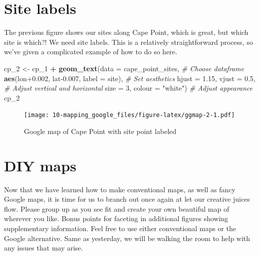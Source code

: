 \documentclass[
]{book}
\newenvironment{Shaded}{\begin{snugshade}}{\end{snugshade}}
\newcommand{\CommentTok}[1]{\textcolor[rgb]{0.56,0.35,0.01}{\textit{#1}}}
\newcommand{\DataTypeTok}[1]{\textcolor[rgb]{0.13,0.29,0.53}{#1}}
\newcommand{\DecValTok}[1]{\textcolor[rgb]{0.00,0.00,0.81}{#1}}
\newcommand{\FloatTok}[1]{\textcolor[rgb]{0.00,0.00,0.81}{#1}}
\newcommand{\KeywordTok}[1]{\textcolor[rgb]{0.13,0.29,0.53}{\textbf{#1}}}
\newcommand{\NormalTok}[1]{#1}
\newcommand{\OperatorTok}[1]{\textcolor[rgb]{0.81,0.36,0.00}{\textbf{#1}}}
\newcommand{\StringTok}[1]{\textcolor[rgb]{0.31,0.60,0.02}{#1}}
\begin{document}
\hypertarget{site-labels}{%
\section{Site labels}\label{site-labels}}

The previous figure shows our sites along Cape Point, which is great, but which site is which?! We need site labels. This is a relatively straightforward process, so we've given a complicated example of how to do so here.

\begin{Shaded}
\begin{Highlighting}[]
\NormalTok{cp\_}\DecValTok{2}\NormalTok{ <{-}}\StringTok{ }\NormalTok{cp\_}\DecValTok{1} \OperatorTok{+}
\StringTok{  }\KeywordTok{geom\_text}\NormalTok{(}\DataTypeTok{data =}\NormalTok{ cape\_point\_sites, }\CommentTok{\# Choose dataframe}
            \KeywordTok{aes}\NormalTok{(lon}\FloatTok{+0.002}\NormalTok{, lat}\FloatTok{{-}0.007}\NormalTok{, }\DataTypeTok{label =}\NormalTok{ site), }\CommentTok{\# Set aesthetics}
            \DataTypeTok{hjust =} \FloatTok{1.15}\NormalTok{, }\DataTypeTok{vjust =} \FloatTok{0.5}\NormalTok{, }\CommentTok{\# Adjust vertical and horizontal}
            \DataTypeTok{size =} \DecValTok{3}\NormalTok{, }\DataTypeTok{colour =} \StringTok{"white"}\NormalTok{) }\CommentTok{\# Adjust appearance}
\NormalTok{cp\_}\DecValTok{2}
\end{Highlighting}
\end{Shaded}

\begin{figure}
\centering
\texttt{[image: 10-mapping\_google\_files/figure-latex/ggmap-2-1.pdf]}
\caption{\label{fig:ggmap-2}Google map of Cape Point with site point labeled}
\end{figure}

\hypertarget{diy-maps}{%
\section{DIY maps}\label{diy-maps}}

Now that we have learned how to make conventional maps, as well as fancy Google maps, it is time for us to branch out once again at let our creative juices flow. Please group up as you see fit and create your own beautiful map of wherever you like. Bonus points for faceting in additional figures showing supplementary information. Feel free to use either conventional maps or the Google alternative. Same as yesterday, we will be walking the room to help with any issues that may arise.
\end{document}
